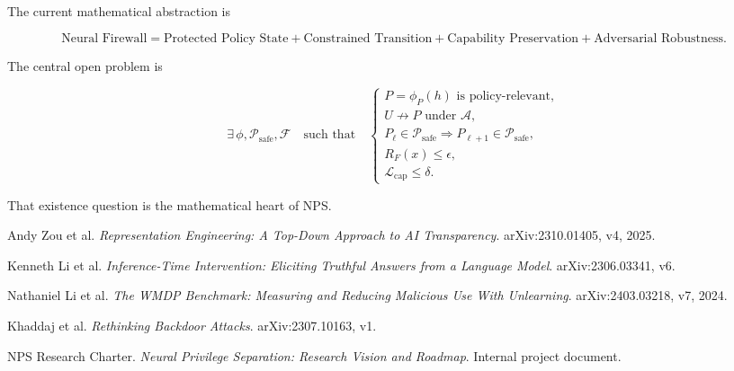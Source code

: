 \documentclass[11pt]{article}
\newcommand{\Psafe}{\mathcal{P}_{\mathrm{safe}}}
\begin{document}
The current mathematical abstraction is

\begin{equation}
\boxed{
\text{Neural Firewall}
=
\text{Protected Policy State}
+
\text{Constrained Transition}
+
\text{Capability Preservation}
+
\text{Adversarial Robustness}.
}
\end{equation}

The central open problem is

\begin{equation}
\boxed{
\exists\,\phi,\Psafe,\mathcal F
\quad\text{such that}\quad
\begin{cases}
P=\phi_P(h)\text{ is policy-relevant},\\
U\not\rightarrow P\text{ under }\mathcal A,\\
P_\ell\in\Psafe\Rightarrow P_{\ell+1}\in\Psafe,\\
R_F(x)\leq\epsilon,\\
\mathcal L_{\mathrm{cap}}\leq\delta.
\end{cases}
}
\end{equation}

That existence question is the mathematical heart of NPS.

\begin{thebibliography}{9}

Andy Zou et al.
\newblock \emph{Representation Engineering: A Top-Down Approach to AI
Transparency}.
\newblock arXiv:2310.01405, v4, 2025.

Kenneth Li et al.
\newblock \emph{Inference-Time Intervention: Eliciting Truthful Answers from
a Language Model}.
\newblock arXiv:2306.03341, v6.

Nathaniel Li et al.
\newblock \emph{The WMDP Benchmark: Measuring and Reducing Malicious Use With
Unlearning}.
\newblock arXiv:2403.03218, v7, 2024.

Khaddaj et al.
\newblock \emph{Rethinking Backdoor Attacks}.
\newblock arXiv:2307.10163, v1.

NPS Research Charter.
\newblock \emph{Neural Privilege Separation: Research Vision and Roadmap}.
\newblock Internal project document.

\end{thebibliography}
\end{document}

